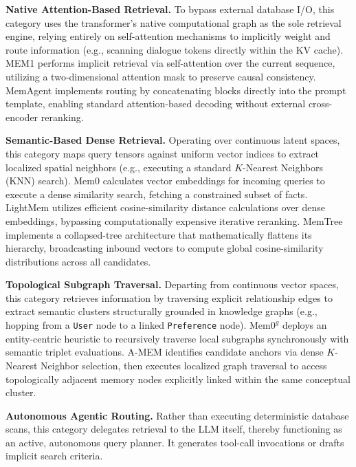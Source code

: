 \documentclass{llmxive}
\providecommand{\llm}{\textsc{LLM}\xspace}
\begin{document}
\noindent  \textbf{Native Attention-Based Retrieval.}
To bypass external database I/O, this category uses the transformer's native computational graph as the sole retrieval engine, relying entirely on self-attention mechanisms to implicitly weight and route information (e.g., scanning dialogue tokens directly within the KV cache). MEM1 performs implicit retrieval via self-attention over the current sequence, utilizing a two-dimensional attention mask to preserve causal consistency. MemAgent implements routing by concatenating blocks directly into the prompt template, enabling standard attention-based decoding without external cross-encoder reranking.

\noindent  \textbf{Semantic-Based Dense Retrieval.}
Operating over continuous latent spaces, this category maps query tensors against uniform vector indices to extract localized spatial neighbors (e.g., executing a standard $K$-Nearest Neighbors (KNN) search). Mem0 calculates vector embeddings for incoming queries to execute a dense similarity search, fetching a constrained subset of facts. LightMem utilizes efficient cosine-similarity distance calculations over dense embeddings, bypassing computationally expensive iterative reranking. MemTree implements a collapsed-tree architecture that mathematically flattens its hierarchy, broadcasting inbound vectors to compute global cosine-similarity distributions across all candidates.


\noindent  \textbf{Topological Subgraph Traversal.}
Departing from continuous vector spaces, this category retrieves information by traversing explicit relationship edges to extract semantic clusters structurally grounded in knowledge graphs (e.g., hopping from a \texttt{User} node to a linked \texttt{Preference} node).
$\text{Mem0}^g$ deploys an entity-centric heuristic to recursively traverse local subgraphs synchronously with semantic triplet evaluations.
A-MEM identifies candidate anchors via dense $K$-Nearest Neighbor selection, then executes localized graph traversal to access topologically adjacent memory nodes explicitly linked within the same conceptual cluster.

\noindent  \textbf{Autonomous Agentic Routing.}
Rather than executing deterministic database scans, this category delegates retrieval to the \llm itself, thereby functioning as an active, autonomous query planner. It generates tool-call invocations or drafts implicit search criteria.
\end{document}
